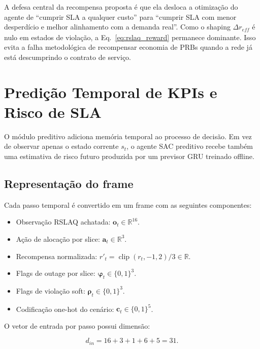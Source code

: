 \documentclass[10pt,a4paper]{IEEEtran}
\begin{document}
A defesa central da recompensa proposta \'{e} que ela desloca a
otimiza\c{c}\~{a}o do agente de ``cumprir SLA a qualquer
custo'' para ``cumprir SLA com menor desperd\'{i}cio e
melhor alinhamento com a demanda real''. Como o shaping
$\Delta r_{\textit{eff}}$ \'{e} nulo em estados de
viola\c{c}\~{a}o, a Eq.~\eqref{eq:rslaq_reward} permanece
dominante. Isso evita a falha metodol\'{o}gica de recompensar
economia de PRBs quando a rede j\'{a} est\'{a} descumprindo
o contrato de servi\c{c}o.

\section{Predi\c{c}\~{a}o Temporal de KPIs e Risco de SLA}
\label{sec:predictive}

O m\'{o}dulo preditivo adiciona mem\'{o}ria temporal ao
processo de decis\~{a}o. Em vez de observar apenas o estado
corrente $s_t$, o agente SAC preditivo recebe tamb\'{e}m uma
estimativa de risco futuro produzida por um previsor GRU
treinado offline.

\subsection{Representa\c{c}\~{a}o do frame}

Cada passo temporal \'{e} convertido em um frame com as
seguintes componentes:

\begin{itemize}
\item Observa\c{c}\~{a}o RSLAQ achatada: $\mathbf{o}_t \in \mathbb{R}^{16}$.
\item A\c{c}\~{a}o de aloca\c{c}\~{a}o por slice: $\mathbf{a}_t \in \mathbb{R}^{3}$.
\item Recompensa normalizada: $r'_t = \operatorname{clip}(r_t, -1, 2)/3 \in \mathbb{R}$.
\item Flags de outage por slice: $\mathbf{\varphi}_t \in \{0,1\}^{3}$.
\item Flags de viola\c{c}\~{a}o soft: $\mathbf{\rho}_t \in \{0,1\}^{3}$.
\item Codifica\c{c}\~{a}o one-hot do cen\'{a}rio: $\mathbf{c}_t \in \{0,1\}^{5}$.
\end{itemize}

O vetor de entrada por passo possui dimens\~{a}o:

\begin{equation}
d_{\textit{in}} = 16 + 3 + 1 + 6 + 5 = 31.
\label{eq:feature_dim}
\end{equation}
\end{document}
